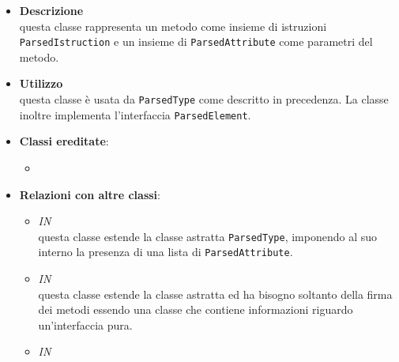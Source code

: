 \label{\nogloxy{swedesigner::server::project::ParsedMethod}}
\begin{figure}[h]
\centering
{}
\caption{}
\end{figure}
\FloatBarrier
\begin{itemize}
\item \textbf{Descrizione}\\
questa classe rappresenta un metodo come insieme di istruzioni \texttt{ParsedIstruction} e un insieme di \texttt{ParsedAttribute} come parametri del metodo.
\item \textbf{Utilizzo}\\
questa classe è usata da \texttt{ParsedType} come descritto in precedenza. La classe inoltre implementa l'interfaccia \texttt{ParsedElement}.
\item \textbf{Classi ereditate}:
\begin{itemize}
\item \hyperref[\nogloxy{swedesigner::server::project::ParsedElement}]{}
\end{itemize}
\item \textbf{Relazioni con altre classi}:
\begin{itemize}
\item \textit{IN} \hyperref[\nogloxy{swedesigner::server::project::ParsedClass}]{}\\
questa classe estende la classe astratta \texttt{ParsedType}, imponendo al suo interno la presenza di una lista di \texttt{ParsedAttribute}. 
\item \textit{IN} \hyperref[\nogloxy{swedesigner::server::project::ParsedInterface}]{}\\
questa classe estende la classe astratta  ed ha bisogno soltanto della firma dei metodi essendo una classe che contiene informazioni riguardo un'interfaccia pura.
\item \textit{IN} \hyperref[\nogloxy{swedesigner::server::project::ParsedType}]{}\\

\end{itemize}
\end{itemize}
